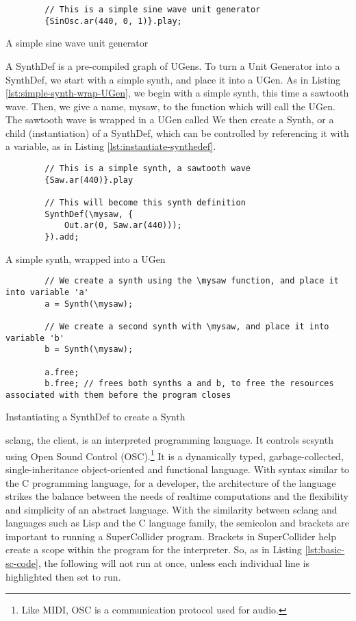 \begin{listing}
	\begin{lstlisting}
		// This is a simple sine wave unit generator
		{SinOsc.ar(440, 0, 1)}.play;
	\end{lstlisting}
	\caption{A simple sine wave unit generator}
	\label{lst:sine-wave-ug}
\end{listing}

A SynthDef is a pre-compiled graph of UGens. To turn a Unit Generator into a SynthDef, we start with a simple synth, and place it into a UGen. As in Listing \ref{lst:simple-synth-wrap-UGen}, we begin with a simple synth, this time a sawtooth wave. Then, we give a name, mysaw, to the function which will call the UGen. The sawtooth wave is wrapped in a UGen called  We then create a Synth, or a child (instantiation) of a SynthDef, which can be controlled by referencing it with a variable, as in Listing \ref{lst:instantiate-synthedef}\cite{McCartney_2021}.

\begin{listing}
	\begin{lstlisting}
		// This is a simple synth, a sawtooth wave
		{Saw.ar(440)}.play
		
		// This will become this synth definition
		SynthDef(\mysaw, {
			Out.ar(0, Saw.ar(440)));
		}).add;
	\end{lstlisting}
	\caption{A simple synth, wrapped into a UGen}
	\label{lst:simple-synth-wrap-UGen}
\end{listing}

\begin{listing}
	\begin{lstlisting}
		// We create a synth using the \mysaw function, and place it into variable 'a'
		a = Synth(\mysaw);
		
		// We create a second synth with \mysaw, and place it into variable 'b'
		b = Synth(\mysaw);
		
		a.free;
		b.free; // frees both synths a and b, to free the resources associated with them before the program closes
	\end{lstlisting}
	\caption{Instantiating a SynthDef to create a Synth}
	\label{lst:instantiate-synthedef}
\end{listing}

sclang, the client, is an interpreted programming language. It controls scsynth using Open Sound Control (OSC).\footnote{Like MIDI, OSC is a communication protocol used for audio.} It is a dynamically typed, garbage-collected, single-inheritance object-oriented and functional language\cite{McCartney_2021}. With syntax similar to the C programming language, for a developer, the architecture of the language strikes the balance between the needs of realtime computations and the flexibility and simplicity of an abstract language. With the similarity between sclang and languages such as Lisp and the C language family, the semicolon and brackets are important to running a SuperCollider program. Brackets in SuperCollider help create a scope within the program for the interpreter. So, as in Listing \ref{lst:basic-sc-code}, the following will not run at once, unless each individual line is highlighted then set to run.

